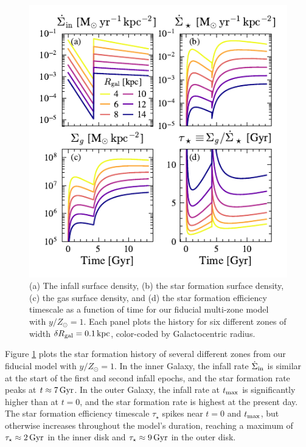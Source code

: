 \documentclass[twocolumn,twocolappendix,linenumbers]{aastex631}
\begin{document}
\begin{figure}
    \includegraphics[width=\linewidth]{figures/star_formation_history.pdf}
    \caption{(a) The infall surface density, (b) the star formation surface density, (c) the gas surface density, and (d) the star formation efficiency timescale as a function of time for our fiducial multi-zone model with $y/Z_\odot=1$. Each panel plots the history for six different zones of width $\delta R_{\rm gal}=0.1\,{\rm kpc}$, color-coded by Galactocentric radius.}
    \label{fig:sfh}
\end{figure}

Figure \ref{fig:sfh} plots the star formation history of several different zones from our fiducial model with $y/Z_\odot=1$. In the inner Galaxy, the infall rate $\dot\Sigma_{\rm in}$ is similar at the start of the first and second infall epochs, and the star formation rate peaks at $t\approx7\,{\rm Gyr}$. In the outer Galaxy, the infall rate at $t_{\rm max}$ is significantly higher than at $t=0$, and the star formation rate is highest at the present day. The star formation efficiency timescale $\tau_\star$ spikes near $t=0$ and $t_{\rm max}$, but otherwise increases throughout the model's duration, reaching a maximum of $\tau_\star\approx2\,{\rm Gyr}$ in the inner disk and $\tau_\star\approx 9\,{\rm Gyr}$ in the outer disk.
\end{document}

